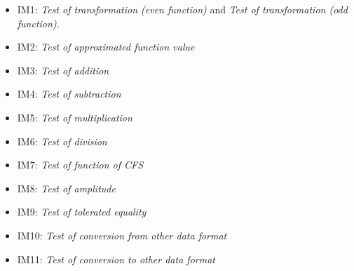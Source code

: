 \documentclass[12pt, titlepage]{article}
\begin{document}
\begin{itemize}
	\item IM1: \textit{Test of transformation (even function)} and \textit{Test of transformation (odd function)}.
	\item IM2: \textit{Test of approximated function value}
	\item IM3: \textit{Test of addition}
	\item IM4: \textit{Test of subtraction}
	\item IM5: \textit{Test of multiplication}
	\item IM6: \textit{Test of division}
	\item IM7: \textit{Test of function of CFS}
	\item IM8: \textit{Test of amplitude}
	\item IM9: \textit{Test of tolerated equality}
	\item IM10: \textit{Test of conversion from other data format}
	\item IM11: \textit{Test of conversion to other data format}
\end{itemize}
				



\end{document}
